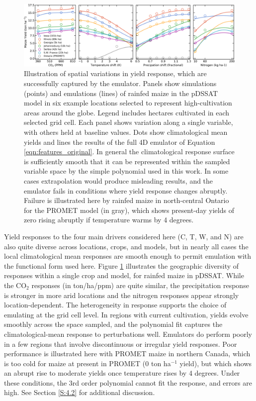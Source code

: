\documentclass[gmdd]{copernicus} %
\begin{document}
\begin{figure}[ht]
\centering
    \includegraphics[width=16.3cm]{figures/regression_example.png}
    \caption{
    Illustration of spatial variations in yield response, which are successfully captured by the emulator. 
    Panels show simulations (points) and emulations (lines) of rainfed maize in the pDSSAT model in six example locations selected to represent high-cultivation areas around the globe. 
    Legend includes hectares cultivated in each selected grid cell. 
    Each panel shows variation along a single variable, with others held at baseline values. 
    Dots show climatological mean yields and lines the results of the full 4D emulator of Equation \ref{eqn:features_original}. 
    In general the climatological response surface is sufficiently smooth that it can be represented within the sampled variable space by the simple polynomial used in this work. 
    In some cases extrapolation would produce misleading results, and the emulator fails in conditions where yield response changes abruptly. 
    Failure is illustrated here by rainfed maize in north-central Ontario for the PROMET model (in gray), which shows present-day yields of zero rising abruptly if temperature warms by 4 degrees.
    }
   \label{fig:regression}
\end{figure}

Yield responses to the four main drivers considered here (C, T, W, and N) are also quite diverse across locations, crops, and models, but in nearly all cases the local climatological mean responses are smooth enough to permit emulation with the functional form used here.
Figure \ref{fig:regression} illustrates the geographic diversity of responses within a single crop and model, for rainfed maize in pDSSAT. 
While the CO$_2$ responses (in ton/ha/ppm) are quite similar, the  precipitation response is stronger in more arid locations and the nitrogen responses appear strongly location-dependent. 
The heterogeneity in response supports the choice of emulating at the grid cell level. 
In regions with current cultivation, yields evolve smoothly across the space sampled, and the polynomial fit captures the climatological-mean response to perturbations well. 
Emulators do perform poorly in a few regions that involve discontinuous or irregular yield responses. 
Poor performance is illustrated here with PROMET maize in northern Canada, which is too cold for maize at present in PROMET (0 ton ha$^{-1}$ yield), but which shows an abrupt rise to moderate yields once temperature rises by 4 degrees.
Under these conditions, the 3rd order polynomial cannot fit the response, and errors are high. See Section \ref{S:4.2} for additional discussion. 
\end{document}
